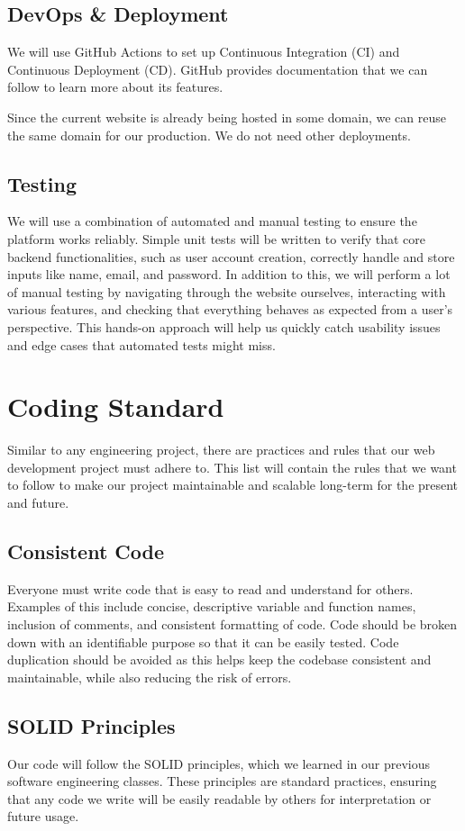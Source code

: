 \documentclass{article}
\begin{document}
\subsection{DevOps \& Deployment}
We will use GitHub Actions to set up Continuous Integration (CI) and Continuous Deployment (CD). GitHub provides documentation that we can follow to learn more about its features.

Since the current website is already being hosted in some domain, we can reuse the same domain for our production. We do not need other deployments.

\subsection{Testing}
We will use a combination of automated and manual testing to ensure the platform works reliably. Simple unit tests will be written to verify that core backend functionalities, such as user account creation, correctly handle and store inputs like name, email, and password. In addition to this, we will perform a lot of manual testing by navigating through the website ourselves, interacting with various features, and checking that everything behaves as expected from a user's perspective. This hands-on approach will help us quickly catch usability issues and edge cases that automated tests might miss.

\section{Coding Standard}
Similar to any engineering project, there are practices and rules that our web development project must adhere to. This list will contain the rules that we want to follow to make our project maintainable and scalable long-term for the present and future.

\subsection{Consistent Code}
Everyone must write code that is easy to read and understand for others. Examples of this include concise, descriptive variable and function names, inclusion of comments, and consistent formatting of code. Code should be broken down with an identifiable purpose so that it can be easily tested. Code duplication should be avoided as this helps keep the codebase consistent and maintainable, while also reducing the risk of errors.

\subsection{SOLID Principles}
Our code will follow the SOLID principles, which we learned in our previous software engineering classes. These principles are standard practices, ensuring that any code we write will be easily readable by others for interpretation or future usage.
\end{document}
